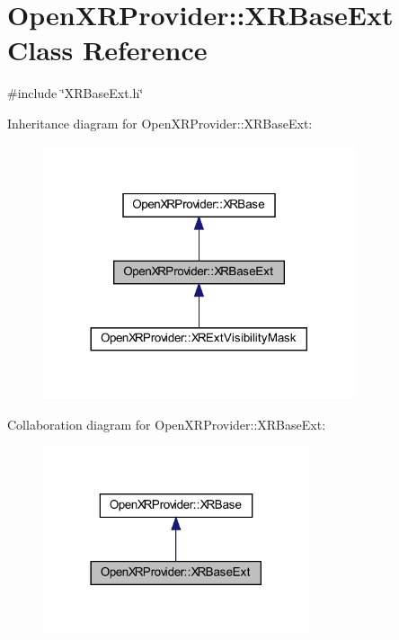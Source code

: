 \hypertarget{class_open_x_r_provider_1_1_x_r_base_ext}{}\section{Open\+X\+R\+Provider\+::X\+R\+Base\+Ext Class Reference}
\label{class_open_x_r_provider_1_1_x_r_base_ext}


{\ttfamily \#include \char`\"{}X\+R\+Base\+Ext.\+h\char`\"{}}



Inheritance diagram for Open\+X\+R\+Provider\+::X\+R\+Base\+Ext\+:\nopagebreak
\begin{figure}[H]
\begin{center}
\leavevmode
\includegraphics[width=260pt]{class_open_x_r_provider_1_1_x_r_base_ext__inherit__graph}
\end{center}
\end{figure}


Collaboration diagram for Open\+X\+R\+Provider\+::X\+R\+Base\+Ext\+:\nopagebreak
\begin{figure}[H]
\begin{center}
\leavevmode
\includegraphics[width=222pt]{class_open_x_r_provider_1_1_x_r_base_ext__coll__graph}
\end{center}
\end{figure}
